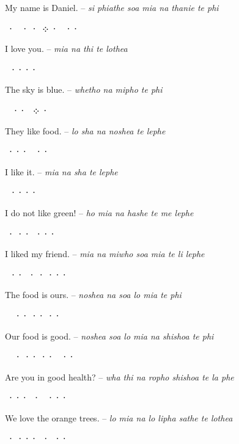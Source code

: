 \documentclass[12pt]{report}
\begin{document}
{\parindent0pt
My name is Daniel. -- \emph{si phiathe soa mia na thanie te phi}
\setlength{\parskip}{0.3em}

\telcontar ⸱⸱⸱⁘⸱⸱⸱ \normalfont
\setlength{\parskip}{1.5em}

I love you. -- \emph{mia na thi te lothea}
\setlength{\parskip}{0.3em}

\telcontar ⸱⸱⸱⸱ \normalfont
\setlength{\parskip}{1.5em}

The sky is blue. -- \emph{whetho na mipho te phi}
\setlength{\parskip}{0.3em}

\telcontar ⸱⸱⁘⸱ \normalfont
\setlength{\parskip}{1.5em}

They like food. -- \emph{lo sha na noshea te lephe}
\setlength{\parskip}{0.3em}

\telcontar ⸱⸱⸱⸱⸱ \normalfont
\setlength{\parskip}{1.5em}

I like it. -- \emph{mia na sha te lephe}
\setlength{\parskip}{0.3em}

\telcontar ⸱⸱⸱⸱ \normalfont
\setlength{\parskip}{1.5em}

I do not like green! -- \emph{ho mia na hashe te me lephe}
\setlength{\parskip}{0.3em}

\telcontar ⸱⸱⸱⸱⸱⸱ \normalfont
\setlength{\parskip}{1.5em}

I liked my friend. -- \emph{mia na miwho soa mia te li lephe}
\setlength{\parskip}{0.3em}

\telcontar ⸱⸱⸱⸱⸱⸱⸱ \normalfont
\setlength{\parskip}{1.5em}

The food is ours. -- \emph{noshea na soa lo mia te phi}
\setlength{\parskip}{0.3em}

\telcontar ⸱⸱⸱⸱⸱⸱ \normalfont

\clearpage
Our food is good. -- \emph{noshea soa lo mia na shishoa te phi}
\setlength{\parskip}{0.3em}

\telcontar ⸱⸱⸱⸱⸱⸱⸱ \normalfont
\setlength{\parskip}{1.5em}

Are you in good health? -- \emph{wha thi na ropho shishoa te la phe}
\setlength{\parskip}{0.3em}

\telcontar ⸱⸱⸱⸱⸱⸱⸱ \normalfont
\setlength{\parskip}{1.5em}

We love the orange trees. -- \emph{lo mia na lo lipha sathe te lothea}
\setlength{\parskip}{0.3em}

\telcontar ⸱⸱⸱⸱⸱⸱⸱ \normalfont
\setlength{\parskip}{1em}
}
\end{document}
